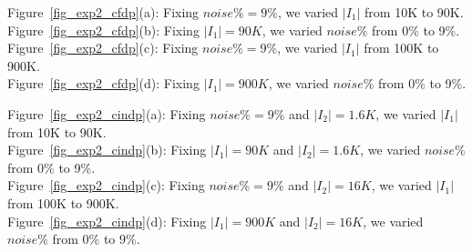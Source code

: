 \noindent Figure~\ref{fig_exp2_cfdp}(a): Fixing $noise\% = 9\%$, we varied $|I_1|$ from 10K to 90K.    \\
Figure~\ref{fig_exp2_cfdp}(b): Fixing $|I_1|=90K$, we varied $noise\%$ from 0\% to 9\%.\\
Figure~\ref{fig_exp2_cfdp}(c): Fixing $noise\% = 9\%$, we varied $|I_1|$ from 100K to 900K.  \\
Figure~\ref{fig_exp2_cfdp}(d): Fixing $|I_1|=900K$, we varied $noise\%$ from 0\% to 9\%.  \\


\begin{figure*}
  \centering
  \centering
  \quad
  \quad
  \quad
  \caption{Effectiveness of detecting \pCIND violations}\label{fig_exp2_cindp}
\end{figure*}

\noindent Figure~\ref{fig_exp2_cindp}(a): Fixing $noise\% = 9\%$ and $|I_2| = 1.6K$, we varied $|I_1|$ from 10K to 90K.\\
Figure~\ref{fig_exp2_cindp}(b): Fixing $|I_1| = 90K$ and $|I_2| = 1.6K$, we varied $noise\%$ from 0\% to 9\%.\\
Figure~\ref{fig_exp2_cindp}(c): Fixing $noise\% = 9\%$ and $|I_2| = 16K$, we varied $|I_1|$ from 100K to 900K.\\
Figure~\ref{fig_exp2_cindp}(d): Fixing $|I_1| = 900K$ and $|I_2| = 16K$, we varied $noise\%$ from 0\% to 9\%.\\



\begin{figure*}
  \centering
  \quad
  \quad
  \quad
  \caption{Effectiveness of detecting \pCFD and \pCIND violations}\label{fig_exp2_both}
\end{figure*}

